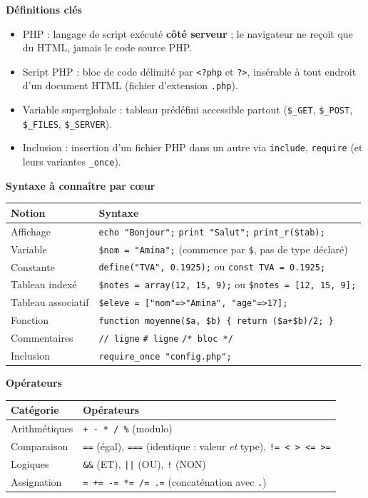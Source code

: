 \documentclass[11pt]{article}
\newcommand{\cle}[1]{{\popxbold\color{popdark}#1}}
\begin{document}
\begin{bilan}
\textbf{Définitions clés}
\begin{itemize}
  \item \cle{PHP} : langage de script exécuté \textbf{côté serveur} ; le navigateur ne reçoit que du HTML, jamais le code source PHP.
  \item \cle{Script PHP} : bloc de code délimité par \texttt{<?php} et \texttt{?>}, insérable à tout endroit d'un document HTML (fichier d'extension \texttt{.php}).
  \item \cle{Variable superglobale} : tableau prédéfini accessible partout (\texttt{\$\_GET}, \texttt{\$\_POST}, \texttt{\$\_FILES}, \texttt{\$\_SERVER}).
  \item \cle{Inclusion} : insertion d'un fichier PHP dans un autre via \texttt{include}, \texttt{require} (et leurs variantes \texttt{\_once}).
\end{itemize}

\textbf{Syntaxe à connaître par c\oe ur}
\begin{center}
\begin{tabularx}{\linewidth}{|l|X|}
\hline
\rowcolor{popblueL} \textbf{Notion} & \textbf{Syntaxe} \\
\hline
Affichage & \texttt{echo "Bonjour";} \quad \texttt{print "Salut";} \quad \texttt{print\_r(\$tab);} \\
\hline
Variable & \texttt{\$nom = "Amina";} (commence par \texttt{\$}, pas de type déclaré) \\
\hline
Constante & \texttt{define("TVA", 0.1925);} ou \texttt{const TVA = 0.1925;} \\
\hline
Tableau indexé & \texttt{\$notes = array(12, 15, 9);} ou \texttt{\$notes = [12, 15, 9];} \\
\hline
Tableau associatif & \texttt{\$eleve = ["nom"=>"Amina", "age"=>17];} \\
\hline
Fonction & \texttt{function moyenne(\$a, \$b) \{ return (\$a+\$b)/2; \}} \\
\hline
Commentaires & \texttt{// ligne} \quad \texttt{\# ligne} \quad \texttt{/* bloc */} \\
\hline
Inclusion & \texttt{require\_once "config.php";} \\
\hline
\end{tabularx}
\end{center}

\textbf{Opérateurs}
\begin{center}
\begin{tabularx}{\linewidth}{|l|X|}
\hline
\rowcolor{popblueL} \textbf{Catégorie} & \textbf{Opérateurs} \\
\hline
Arithmétiques & \texttt{+ - * / \%} (modulo) \\
\hline
Comparaison & \texttt{==} (égal), \texttt{===} (identique : valeur \emph{et} type), \texttt{!= < > <= >=} \\
\hline
Logiques & \texttt{\&\&} (ET), \texttt{||} (OU), \texttt{!} (NON) \\
\hline
Assignation & \texttt{= += -= *= /= .=} (concaténation avec \texttt{.}) \\
\hline
\end{tabularx}
\end{center}


\end{bilan}
\end{document}
